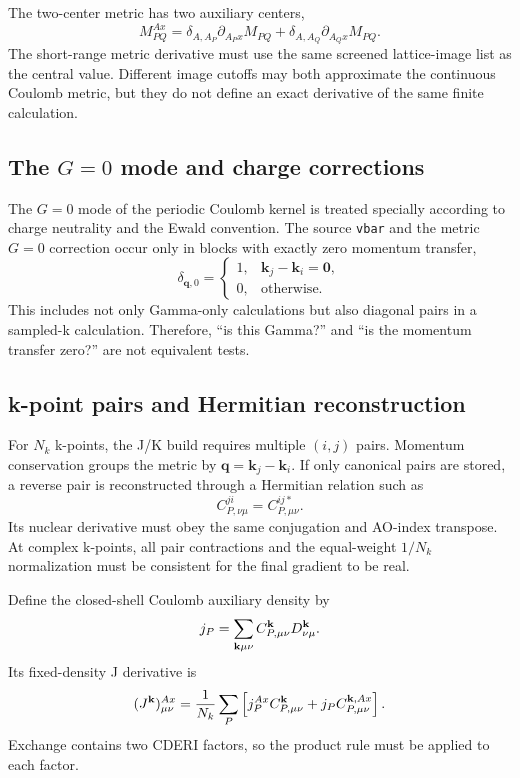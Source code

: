 The two-center metric has two auxiliary centers,
\begin{equation}
  M_{PQ}^{Ax}
  =\delta_{A,A_P}\partial_{A_Px}M_{PQ}
  +\delta_{A,A_Q}\partial_{A_Qx}M_{PQ}.
\end{equation}
The short-range metric derivative must use the same screened lattice-image list
as the central value.  Different image cutoffs may both approximate the
continuous Coulomb metric, but they do not define an exact derivative of the
same finite calculation.

\subsection{The \texorpdfstring{$G=0$}{G=0} mode and charge corrections}

The $G=0$ mode of the periodic Coulomb kernel is treated specially according
to charge neutrality and the Ewald convention.  The source \texttt{vbar} and
the metric $G=0$ correction occur only in blocks with exactly zero momentum
transfer,
\begin{equation}
  \delta_{\mathbf q,0}=\begin{cases}
    1,& \mathbf k_j-\mathbf k_i=\mathbf 0,\\
    0,& \text{otherwise}.
  \end{cases}
\end{equation}
This includes not only Gamma-only calculations but also diagonal pairs in a
sampled-k calculation.  Therefore, ``is this Gamma?'' and ``is the momentum
transfer zero?'' are not equivalent tests.

\subsection{k-point pairs and Hermitian reconstruction}

For $N_k$ k-points, the J/K build requires multiple $(i,j)$ pairs.  Momentum
conservation groups the metric by $\mathbf q=\mathbf k_j-\mathbf k_i$.  If only
canonical pairs are stored, a reverse pair is reconstructed through a
Hermitian relation such as
\begin{equation}
  C^{ji}_{P,\nu\mu}=C^{ij*}_{P,\mu\nu}.
\end{equation}
Its nuclear derivative must obey the same conjugation and AO-index transpose.
At complex k-points, all pair contractions and the equal-weight $1/N_k$
normalization must be consistent for the final gradient to be real.

Define the closed-shell Coulomb auxiliary density by
\begin{equation}
  j_P=\sum_{\mathbf{k}\mu\nu}C^{\mathbf{k}}_{P,\mu\nu}D^{\mathbf{k}}_{\nu\mu}.
\end{equation}
Its fixed-density J derivative is
\begin{equation}
  (J^{\mathbf{k}})^{Ax}_{\mu\nu}
  =\frac{1}{N_k}\sum_P
  \left[j_P^{Ax}C^{\mathbf{k}}_{P,\mu\nu}
  +j_PC^{\mathbf{k},Ax}_{P,\mu\nu}\right].
\end{equation}
Exchange contains two CDERI factors, so the product rule must be applied to
each factor.

